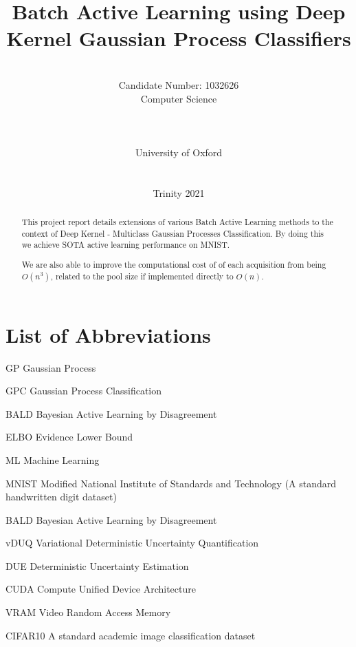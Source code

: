 \documentclass[12pt, a4paper]{report}
\date{}
\title{Batch Active Learning using Deep Kernel Gaussian Process Classifiers}
\author{\\ \Large{Candidate Number: 1032626}
\\ Computer Science
\\
\\
\\
\\ University of Oxford
\\
\\ \\
Trinity 2021
}
\theoremstyle{definition}
\theoremstyle{definition}
\theoremstyle{definition}
\begin{document}

\thispagestyle{headings}
	\maketitle
\FloatBarrier
{}


\thispagestyle{empty}
\begin{abstract}

This project report details extensions of various Batch Active Learning methods to the context of Deep Kernel - Multiclass Gaussian Processes Classification. By doing this we achieve SOTA active learning performance on MNIST.

We are also able to improve the computational cost of of each acquisition from being $O(n^3)$, related to the pool size if implemented directly to $O(n)$.


\end{abstract}
\tableofcontents
\thispagestyle{plain}
\listoffigures
\listoftables
\listofalgocfs
\listoftheorems
\chapter*{List of Abbreviations}
\begin{abbreviations}
    \item[GP] Gaussian Process
    \item[GPC] Gaussian Process Classification
    \item[BALD] Bayesian Active Learning by Disagreement
    \item[ELBO] Evidence Lower Bound
    \item[ML] Machine Learning
    \item[MNIST] Modified National Institute of Standards and Technology (A standard handwritten digit dataset)
    \item[BALD] Bayesian Active Learning by Disagreement
    \item[vDUQ] Variational Deterministic Uncertainty Quantification
    \item[DUE]   Deterministic Uncertainty Estimation
    \item[CUDA] Compute Unified Device Architecture
    \item[VRAM] Video Random Access Memory  
    \item[CIFAR10] A standard academic image classification dataset 
\end{abbreviations}
\end{document}
